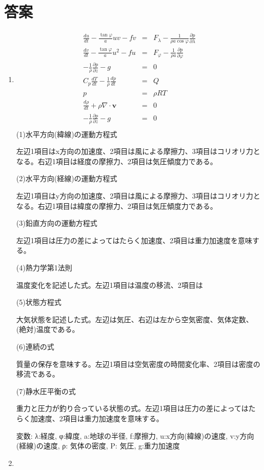 \documentclass{jsarticle}
\newenvironment{problems}
{
  \renewcommand\labelenumi{\doublebox{\arabic{enumi}}}
  \begin{enumerate}
}{
  \end{enumerate}
  \renewcommand\labelenumi{\arabic{enumi}.}
}
\begin{document}
\section{答案}
\begin{problems}
\item
    \begin{eqnarray}
    \frac{du}{dt}-\frac{\tan\varphi}{a}uv -fv &=& F_{\lambda} - \frac{1}{\rho a \cos\varphi}\frac{\partial p}{\partial \lambda}\\
    \frac{dv}{dt}-\frac{\tan\varphi}{a}u^2 -fu &=& F_{\varphi} - \frac{1}{\rho  a}\frac{\partial p}{\partial \varphi}\\
    -\frac{1}{\rho}\frac{\partial p}{\partial z}-g &=& 0\\
    C_p\frac{dT}{dt}-\frac{1}{\rho}\frac{dp}{dt} &=& Q\\
    p &=& \rho R T\\
    \frac{d\rho}{dt} + \rho\nabla\cdot \bm{v}&=& 0\\
   -\frac{1}{\rho}\frac{\partial p}{\partial z}-g &=& 0\\
    \end{eqnarray}
(1)水平方向(緯線)の運動方程式

左辺1項目はx方向の加速度、2項目は風による摩擦力、3項目はコリオリ力となる。右辺1項目は経度の摩擦力、2項目は気圧傾度力である。

(2)水平方向(経線)の運動方程式

左辺1項目はy方向の加速度、2項目は風による摩擦力、3項目はコリオリ力となる。右辺1項目は緯度の摩擦力、2項目は気圧傾度力である。

(3)鉛直方向の運動方程式

左辺1項目は圧力の差によってはたらく加速度、2項目は重力加速度を意味する。

(4)熱力学第1法則

温度変化を記述した式。左辺1項目は温度の移流、2項目は

(5)状態方程式

大気状態を記述した式。左辺は気圧、右辺は左から空気密度、気体定数、(絶対)温度である。

(6)連続の式

質量の保存を意味する。左辺1項目は空気密度の時間変化率、2項目は密度の移流である。

(7)静水圧平衡の式

重力と圧力が釣り合っている状態の式。左辺1項目は圧力の差によってはたらく加速度、2項目は重力加速度を意味する。

変数:  λ:経度, φ:緯度, a:地球の半径, f:摩擦力, u:x方向(緯線)の速度, v:y方向(経線)の速度, ρ: 気体の密度, P: 気圧, g:重力加速度
\item 


\end{problems}
\end{document}
